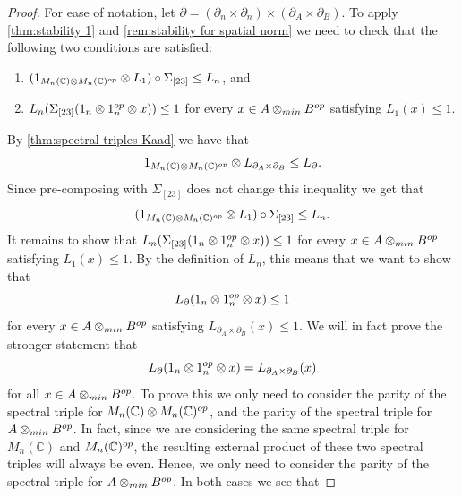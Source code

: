 \documentclass[10pt,a4paper]{amsart}
\newcommand{\bbC}{\mathbb{C}}
\begin{document}
\begin{proof}
    For ease of notation, let $\partial = (\partial_n \times \partial_n) \times (\partial_A \times \partial_B)$. To apply \cref{thm:stability 1} and \cref{rem:stability for spatial norm} we need to check that the following two conditions are satisfied:
    \begin{enumerate}
        \item $(1_{M_n(\bbC) \otimes M_n(\bbC)^{\rm op}} \otimes L_1) \circ \Sigma_{[23]} \leq L_n$, and
        \item $L_n(\Sigma_{[23]}(1_n \otimes 1_n^{\rm op} \otimes x)) \leq 1$ for every $x \in A \otimes_{\rm min} B^{\rm op}$ satisfying $L_1(x) \leq 1$.
    \end{enumerate}
    By \cref{thm:spectral triples Kaad} we have that
    \begin{equation*}
        1_{M_n(\bbC) \otimes M_n(\bbC)^{\rm op}} \otimes L_{\partial_A \times \partial_B} \leq L_{\partial}.
    \end{equation*}
    Since pre-composing with $\Sigma_{[23]}$ does not change this inequality we get that
    \begin{equation*}
        (1_{M_n(\bbC) \otimes M_n(\bbC)^{\rm op}} \otimes L_1) \circ \Sigma_{[23]} \leq L_n.
    \end{equation*}
    It remains to show that $L_n(\Sigma_{[23]}(1_n \otimes 1_n^{\rm op} \otimes x)) \leq 1$ for every $x \in A \otimes_{\rm min} B^{\rm op}$ satisfying $L_1(x) \leq 1$. By the definition of $L_n$, this means that we want to show that
    \begin{equation*}
        L_{\partial}(1_n \otimes 1_n^{\rm op} \otimes x) \leq 1
    \end{equation*}
    for every $x \in A \otimes_{\rm min} B^{\rm op}$ satisfying $L_{\partial_A \times \partial_B}(x) \leq 1$. We will in fact prove the stronger statement that
    \begin{equation}\label{eqn:seminorm from external products}
        L_{\partial}(1_n \otimes 1_n^{\rm op} \otimes x) = L_{\partial_A \times \partial_B}(x)
    \end{equation}
    for all $x \in A \otimes_{\rm min} B^{\rm op}$. To prove this we only need to consider the parity of the spectral triple for $M_n(\bbC) \otimes M_n(\bbC)^{\rm op}$, and the parity of the spectral triple for $A \otimes_{\rm min} B^{\rm op}$. In fact, since we are considering the same spectral triple for $M_n(\bbC)$ and $M_n(\bbC)^{\rm op}$, the resulting external product of these two spectral triples will always be even. Hence, we only need to consider the parity of the spectral triple for $A \otimes_{\rm min} B^{\rm op}$. In both cases we see that

\end{proof}
\end{document}
